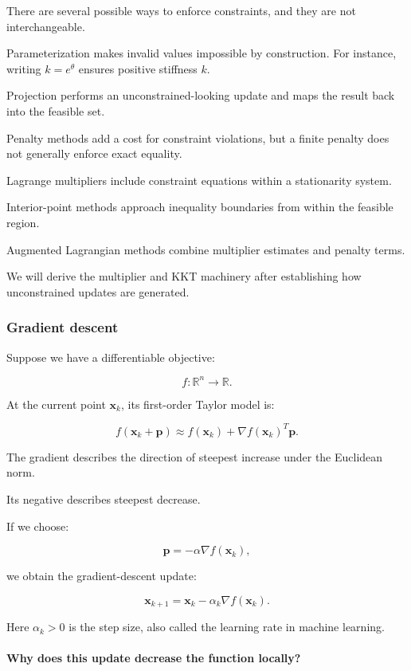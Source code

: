 There are several possible ways to enforce constraints, and they are not interchangeable.

Parameterization makes invalid values impossible by construction. For instance, writing \(k=e^\theta\) ensures positive stiffness \(k\).

Projection performs an unconstrained-looking update and maps the result back into the feasible set.

Penalty methods add a cost for constraint violations, but a finite penalty does not generally enforce exact equality.

Lagrange multipliers include constraint equations within a stationarity system.

Interior-point methods approach inequality boundaries from within the feasible region.

Augmented Lagrangian methods combine multiplier estimates and penalty terms.

We will derive the multiplier and KKT machinery after establishing how unconstrained updates are generated.

\subsubsection{Gradient descent}\label{02-foundations-ii-ch026-gradient-descent}

Suppose we have a differentiable objective:

\[
f:\mathbb R^n\to\mathbb R.
\]

At the current point \(\mathbf x_k\), its first-order Taylor model is:

\[
f(\mathbf x_k+\mathbf p) \approx f(\mathbf x_k)+\nabla f(\mathbf x_k)^T\mathbf p.
\]

The gradient describes the direction of steepest increase under the Euclidean norm.

Its negative describes steepest decrease.

If we choose:

\[
\mathbf p=-\alpha\nabla f(\mathbf x_k),
\]

we obtain the gradient-descent update:

\[
\boxed{ \mathbf x_{k+1} = \mathbf x_k-\alpha_k\nabla f(\mathbf x_k) }.
\]

Here \(\alpha_k>0\) is the step size, also called the learning rate in machine learning.

\paragraph{Why does this update decrease the function locally?}\label{02-foundations-ii-ch026-why-does-this-update-decrease-the-function-locally}

